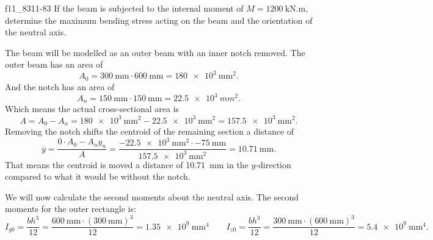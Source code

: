 
\begin{problemwithimage}{f11_83}{11-83}
  If the beam is subjected to the internal moment of $M = \qty{1200}{\kN.\m}$, determine the maximum bending stress acting on the beam and the orientation of the neutral axis.
\end{problemwithimage}

\begin{derivation}
  The beam will be modelled as an outer beam with an inner notch removed.
  The outer beam has an area of
  \begin{equation*}
    A_0 = \qty{300}{\mm} \cdot \qty{600}{\mm}  = \qty{180e3}{\mm^2}
  .\end{equation*}
  And the notch has an area of
  \begin{equation*}
    A_n = \qty{150}{\mm} \cdot \qty{150}{\mm}  = \qty{22,5e3}{mm^2}
  .\end{equation*}
  Which means the actual cross-sectional area is
  \begin{equation*}
    A = A_0 - A_n = \qty{180e3}{\mm^2} - \qty{22,5e3}{\mm^2}  = \qty{157,5e3}{\mm^2} 
  .\end{equation*}
  Removing the notch shifts the centroid of the remaining section a distance of
  \begin{equation*}
    \overline{y} = \frac{0 \cdot A_0 - A_n y_n}{A} = \frac{- \qty{22.5e3}{\mm^2} \cdot \qty{-75}{\mm}}{\qty{157.5 e3}{\mm^2} } = \qty{10.71}{\mm} 
  .\end{equation*}
  That means the centroid is moved a distance of \qty{10.71}{\mm} in the $y$-direction compared to what it would be without the notch.

  We will now calculate the second moments about the neutral axis.
  The second moments for the outer rectangle is:
  \begin{equation*}
    I_{y0} = \frac{bh^3}{12} = \frac{\qty{600}{\mm} \cdot \left( \qty{300}{\mm}  \right)^3}{12} = \qty{1.35e9}{\mm^4} \qquad I_{z0} = \frac{bh^3}{12} = \frac{\qty{300}{\mm} \cdot \left( \qty{600}{\mm}  \right)^3}{12} = \qty{5.4e9}{\mm^4}
  .\end{equation*}
  

\end{derivation}
